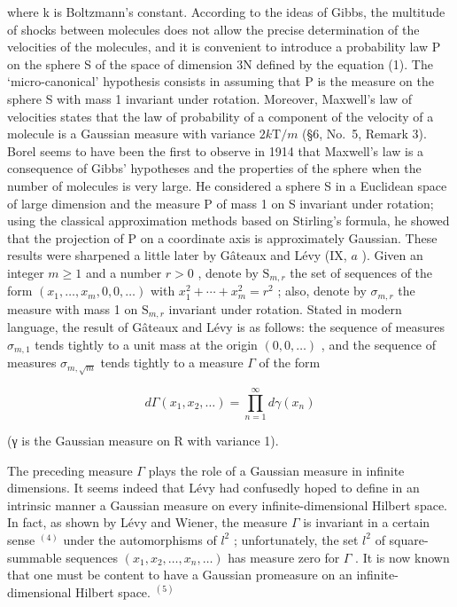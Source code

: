 where k is Boltzmann's constant. According to the ideas of Gibbs, the multitude of shocks between molecules does not allow the precise determination of the velocities of the molecules, and it is convenient to introduce a probability law P on the sphere S of the space of dimension 3N defined by the equation (1). The `micro-canonical' hypothesis consists in assuming that P is the measure on the sphere S with mass 1 invariant under rotation. Moreover, Maxwell's law of velocities states that the law of probability of a component of the velocity of a molecule is a Gaussian measure with variance \(2k\mathrm{T} / m\) (§6, No.~5, Remark 3). Borel seems to have been the first to observe in 1914 that Maxwell's law is a consequence of Gibbs' hypotheses and the properties of the sphere when the number of molecules is very large. He considered a sphere S in a Euclidean space of large dimension and the measure P of mass 1 on S invariant under rotation; using the classical approximation methods based on Stirling's formula, he showed that the projection of P on a coordinate axis is approximately Gaussian. These results were sharpened a little later by Gâteaux and Lévy (IX, \(a\) ). Given an integer \(m \geqslant 1\) and a number \(r > 0\) , denote by \(\mathrm{S}_{m,r}\) the set of sequences of the form \((x_{1}, \ldots, x_{m}, 0, 0, \ldots)\) with \(x_{1}^{2} + \cdots + x_{m}^{2} = r^{2}\) ; also, denote by \(\sigma_{m,r}\) the measure with mass 1 on \(\mathrm{S}_{m,r}\) invariant under rotation. Stated in modern language, the result of Gâteaux and Lévy is as follows: the sequence of measures \(\sigma_{m,1}\) tends tightly to a unit mass at the origin \((0, 0, \ldots)\) , and the sequence of measures \(\sigma_{m,\sqrt{m}}\) tends tightly to a measure \(\Gamma\) of the form

\[
d \Gamma (x _ {1}, x _ {2}, \dots) = \prod_ {n = 1} ^ {\infty} d \gamma (x _ {n})
\]

(γ is the Gaussian measure on R with variance 1).

The preceding measure \(\Gamma\) plays the role of a Gaussian measure in infinite dimensions. It seems indeed that Lévy had confusedly hoped to define in an intrinsic manner a Gaussian measure on every infinite-dimensional Hilbert space. In fact, as shown by Lévy and Wiener, the measure \(\Gamma\) is invariant in a certain sense \(^{(4)}\) under the automorphisms of \(l^{2}\) ; unfortunately, the set \(l^{2}\) of square-summable sequences \((x_{1}, x_{2}, \ldots, x_{n}, \ldots)\) has measure zero for \(\Gamma\) . It is now known that one must be content to have a Gaussian promeasure on an infinite-dimensional Hilbert space. \(^{(5)}\)

